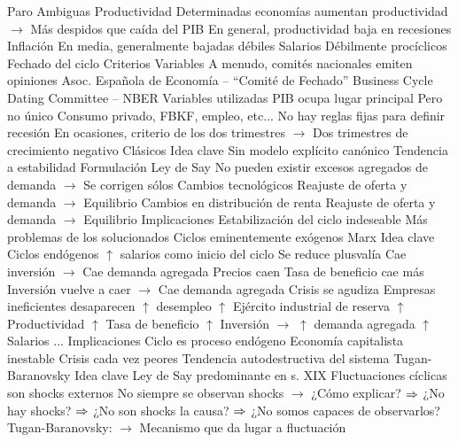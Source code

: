 \documentclass{nuevotema}
\begin{document}
\begin{esquemal}
				\4[] Paro
			\3 Ambiguas
				\4 Productividad
				\4[] Determinadas economías aumentan productividad
				\4[] $\to$ Más despidos que caída del PIB
				\4[] En general, productividad baja en recesiones
				\4 Inflación
				\4[] En media, generalmente bajadas débiles
				\4 Salarios
				\4[] Débilmente procíclicos
		\2 Fechado del ciclo
			\3 Criterios
				\4 Variables
				\4 A menudo, comités nacionales emiten opiniones
				\4 Asoc. Española de Economía -- ``Comité de Fechado''
				\4 Business Cycle Dating Committee -- NBER
			\3 Variables utilizadas
				\4 PIB ocupa lugar principal
				\4[] Pero no único
				\4 Consumo privado, FBKF, empleo, etc...
				\4 No hay reglas fijas para definir recesión
				\4[] En ocasiones, criterio de los dos trimestres
				\4[] $\to$ Dos trimestres de crecimiento negativo
	\1 
		\2 Clásicos
			\3 Idea clave
				\4 Sin modelo explícito canónico
				\4 Tendencia a estabilidad
				\4
			\3 Formulación
				\4 Ley de Say
				\4[] No pueden existir excesos agregados de demanda
				\4[] $\to$ Se corrigen sólos
				\4 Cambios tecnológicos
				\4[] Reajuste de oferta y demanda
				\4[] $\to$ Equilibrio
				\4 Cambios en distribución de renta
				\4[] Reajuste de oferta y demanda
				\4[] $\to$ Equilibrio
			\3 Implicaciones
				\4 Estabilización del ciclo indeseable
				\4[] Más problemas de los solucionados
				\4 Ciclos eminentemente exógenos
		\2 Marx
			\3 Idea clave
				\4 Ciclos endógenos
				\4 $\uparrow$ salarios como inicio del ciclo
				\4[] Se reduce plusvalía
				\4[] Cae inversión $\to$ Cae demanda agregada
				\4[] Precios caen
				\4[] Tasa de beneficio cae más
				\4[] Inversión vuelve a caer
				\4[] $\to$ Cae demanda agregada
				\4[] Crisis se agudiza
				\4[] Empresas ineficientes desaparecen
				\4[] $\uparrow$ desempleo
				\4[] $\uparrow$ Ejército industrial de reserva
				\4[] $\uparrow$ Productividad
				\4[] $\uparrow$ Tasa de beneficio
				\4[] $\uparrow$ Inversión $\to$ $\uparrow$ demanda agregada
				\4[] $\uparrow$ Salarios
				\4[] ...
			\3 Implicaciones
				\4 Ciclo es proceso endógeno
				\4 Economía capitalista inestable
				\4 Crisis cada vez peores
				\4 Tendencia autodestructiva del sistema
		\2 Tugan-Baranovsky
			\3 Idea clave
				\4 Ley de Say predominante en s. XIX
				\4[] Fluctuaciones cíclicas son shocks externos
				\4 No siempre se observan shocks
				\4[] $\to$ ¿Cómo explicar?
				\4[] $\Rightarrow$ ¿No hay shocks?
				\4[] $\Rightarrow$ ¿No son shocks la causa?
				\4[] $\Rightarrow$ ¿No somos capaces de observarlos?
				\4 Tugan-Baranovsky:
				\4[] $\to$ Mecanismo que da lugar a fluctuación

\end{esquemal}
\end{document}
